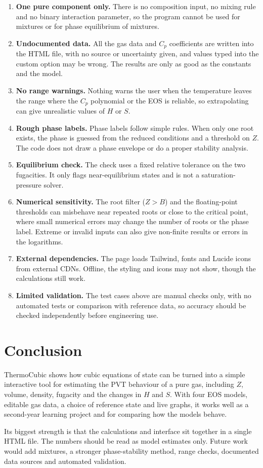 \documentclass[11pt,a4paper]{article}
\begin{document}
\begin{enumerate}
  \item \textbf{One pure component only.} There is no composition input, no mixing rule and no binary interaction parameter, so the program cannot be used for mixtures or for phase equilibrium of mixtures.
  \item \textbf{Undocumented data.} All the gas data and $C_p$ coefficients are written into the HTML file, with no source or uncertainty given, and values typed into the custom option may be wrong. The results are only as good as the constants and the model.
  \item \textbf{No range warnings.} Nothing warns the user when the temperature leaves the range where the $C_p$ polynomial or the EOS is reliable, so extrapolating can give unrealistic values of $H$ or $S$.
  \item \textbf{Rough phase labels.} Phase labels follow simple rules. When only one root exists, the phase is guessed from the reduced conditions and a threshold on $Z$. The code does not draw a phase envelope or do a proper stability analysis.
  \item \textbf{Equilibrium check.} The check uses a fixed relative tolerance on the two fugacities. It only flags near-equilibrium states and is not a saturation-pressure solver.
  \item \textbf{Numerical sensitivity.} The root filter ($Z > B$) and the floating-point thresholds can misbehave near repeated roots or close to the critical point, where small numerical errors may change the number of roots or the phase label. Extreme or invalid inputs can also give non-finite results or errors in the logarithms.
  \item \textbf{External dependencies.} The page loads Tailwind, fonts and Lucide icons from external CDNs. Offline, the styling and icons may not show, though the calculations still work.
  \item \textbf{Limited validation.} The test cases above are manual checks only, with no automated tests or comparison with reference data, so accuracy should be checked independently before engineering use.
\end{enumerate}

\section{Conclusion}

ThermoCubic shows how cubic equations of state can be turned into a simple interactive tool for estimating the PVT behaviour of a pure gas, including $Z$, volume, density, fugacity and the changes in $H$ and $S$. With four EOS models, editable gas data, a choice of reference state and live graphs, it works well as a second-year learning project and for comparing how the models behave.

Its biggest strength is that the calculations and interface sit together in a single HTML file. The numbers should be read as model estimates only. Future work would add mixtures, a stronger phase-stability method, range checks, documented data sources and automated validation.
\end{document}
